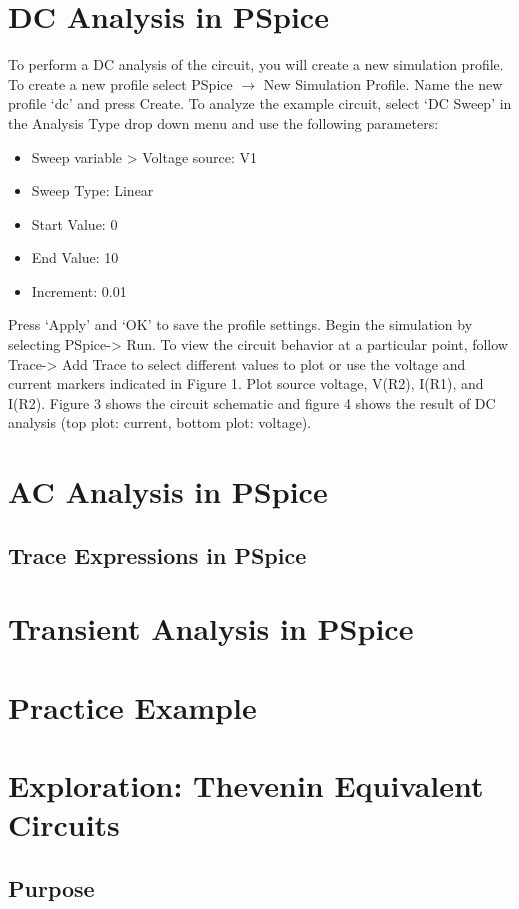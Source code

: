 \documentclass[12pt]{../manual}
\begin{document}
\section{DC Analysis in PSpice}
To perform a DC analysis of the circuit, you will create a new simulation profile. To create a new profile select PSpice $\to$ New Simulation Profile. Name the new profile `dc' and press Create. To analyze the example circuit, select `DC Sweep' in the Analysis Type drop down menu and use the following parameters:
\begin{itemize}
\item Sweep variable > Voltage source: V1
\item Sweep Type: Linear
\item Start Value: 0
\item End Value: 10
\item Increment: 0.01
\end{itemize}
Press `Apply' and `OK' to save the profile settings. Begin the simulation by selecting PSpice-> Run. To view the circuit behavior at a particular point, follow Trace-> Add Trace to select different values to plot or use the voltage and current markers indicated in Figure 1. Plot source voltage, V(R2), I(R1), and I(R2). Figure 3 shows the circuit schematic and figure 4 shows the result of DC analysis (top plot: current, bottom plot: voltage).

\section{AC Analysis in PSpice}

\subsection{Trace Expressions in PSpice}

\section{Transient Analysis in PSpice}

\section{Practice Example}

\section{Exploration: Thevenin Equivalent Circuits}
\subsection{Purpose}
\end{document}
